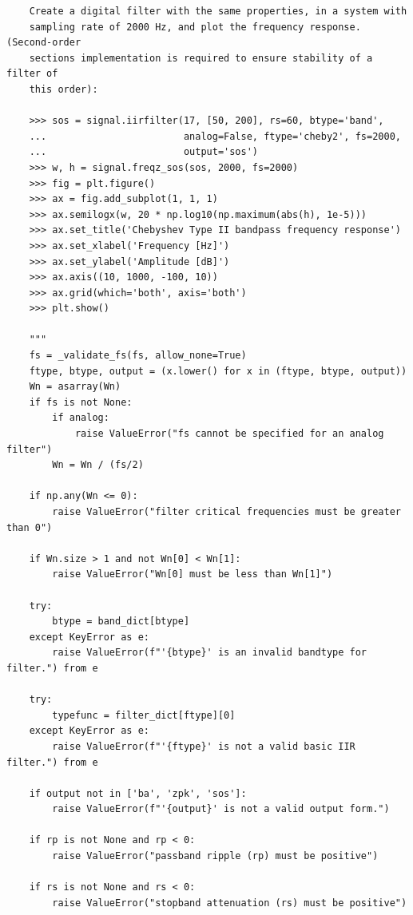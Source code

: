 \documentclass[12pt,a4paper]{article}
\begin{document}
\begin{itemize}
\begin{verbatim}
    Create a digital filter with the same properties, in a system with
    sampling rate of 2000 Hz, and plot the frequency response. (Second-order
    sections implementation is required to ensure stability of a filter of
    this order):

    >>> sos = signal.iirfilter(17, [50, 200], rs=60, btype='band',
    ...                        analog=False, ftype='cheby2', fs=2000,
    ...                        output='sos')
    >>> w, h = signal.freqz_sos(sos, 2000, fs=2000)
    >>> fig = plt.figure()
    >>> ax = fig.add_subplot(1, 1, 1)
    >>> ax.semilogx(w, 20 * np.log10(np.maximum(abs(h), 1e-5)))
    >>> ax.set_title('Chebyshev Type II bandpass frequency response')
    >>> ax.set_xlabel('Frequency [Hz]')
    >>> ax.set_ylabel('Amplitude [dB]')
    >>> ax.axis((10, 1000, -100, 10))
    >>> ax.grid(which='both', axis='both')
    >>> plt.show()

    """
    fs = _validate_fs(fs, allow_none=True)
    ftype, btype, output = (x.lower() for x in (ftype, btype, output))
    Wn = asarray(Wn)
    if fs is not None:
        if analog:
            raise ValueError("fs cannot be specified for an analog filter")
        Wn = Wn / (fs/2)

    if np.any(Wn <= 0):
        raise ValueError("filter critical frequencies must be greater than 0")

    if Wn.size > 1 and not Wn[0] < Wn[1]:
        raise ValueError("Wn[0] must be less than Wn[1]")

    try:
        btype = band_dict[btype]
    except KeyError as e:
        raise ValueError(f"'{btype}' is an invalid bandtype for filter.") from e

    try:
        typefunc = filter_dict[ftype][0]
    except KeyError as e:
        raise ValueError(f"'{ftype}' is not a valid basic IIR filter.") from e

    if output not in ['ba', 'zpk', 'sos']:
        raise ValueError(f"'{output}' is not a valid output form.")

    if rp is not None and rp < 0:
        raise ValueError("passband ripple (rp) must be positive")

    if rs is not None and rs < 0:
        raise ValueError("stopband attenuation (rs) must be positive")


\end{verbatim}
\end{itemize}
\end{document}
